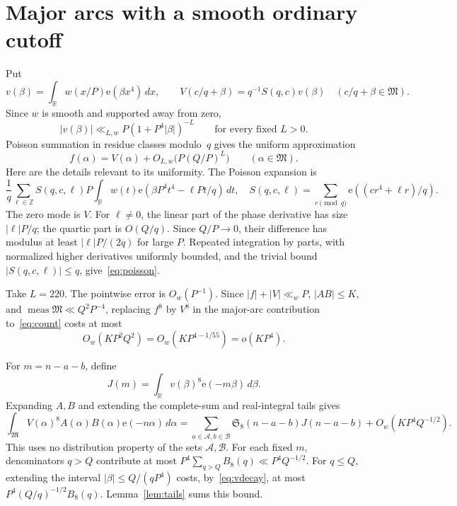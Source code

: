 \documentclass[11pt]{article}
\theoremstyle{remark}\newtheorem*{remark}{Remark}
\newcommand{\e}{\mathrm e}
\newcommand{\M}{\mathfrak M}
\newcommand{\SSS}{\mathfrak S}
\DeclareMathOperator{\meas}{meas}
\begin{document}
\section{Major arcs with a smooth ordinary cutoff}

Put
\[
 v(\beta)=\int_{\mathbb R}w(x/P)\e(\beta x^4)\,dx,
 \qquad V(c/q+\beta)=q^{-1}S(q,c)v(\beta)
 \quad(c/q+\beta\in\M).
\]
Since \(w\) is smooth and supported away from zero,
\begin{equation}\label{eq:vdecay}
 |v(\beta)|\ll_{L,w}P(1+P^4|\beta|)^{-L}
 \qquad\text{for every fixed }L>0.
\end{equation}
Poisson summation in residue classes modulo~\(q\) gives the uniform
approximation
\begin{equation}\label{eq:poisson}
 f(\alpha)=V(\alpha)+O_{L,w}\bigl(P(Q/P)^L\bigr)
 \qquad(\alpha\in\M).
\end{equation}
Here are the details relevant to its uniformity. The Poisson expansion is
\[
 \frac1q\sum_{\ell\in\mathbb Z}S(q,c,\ell)P
 \int_{\mathbb R}w(t)\e(\beta P^4t^4-\ell Pt/q)\,dt,
 \quad S(q,c,\ell)=\sum_{r\pmod q}\e((cr^4+\ell r)/q).
\]
The zero mode is \(V\). For \(\ell\ne0\), the linear part of the
phase derivative has size \(|\ell|P/q\); the quartic part is \(O(Q/q)\).
Since \(Q/P\to0\), their difference has modulus at least
\(|\ell|P/(2q)\) for large \(P\). Repeated integration by parts,
with normalized higher derivatives uniformly bounded, and the trivial
bound \(|S(q,c,\ell)|\le q\), give~\eqref{eq:poisson}.

Take \(L=220\). The pointwise error is \(O_w(P^{-1})\).
Since \(|f|+|V|\ll_w P\), \(|AB|\le K\), and
\(\meas\M\ll Q^2P^{-4}\), replacing \(f^8\) by \(V^8\) in
the major-arc contribution to~\eqref{eq:count} costs at most
\begin{equation}\label{eq:replace}
 O_w(KP^2Q^2)=O_w(KP^{4-1/55})=o(KP^4).
\end{equation}

For \(m=n-a-b\), define
\[
 J(m)=\int_{\mathbb R}v(\beta)^8\e(-m\beta)\,d\beta.
\]
Expanding \(A,B\) and extending the complete-sum and real-integral
tails gives
\begin{equation}\label{eq:major}
 \int_\M V(\alpha)^8A(\alpha)B(\alpha)\e(-n\alpha)\,d\alpha
 =\sum_{a\in\mathcal A,b\in\mathcal B}\SSS_8(n-a-b)J(n-a-b)
   +O_w(KP^4Q^{-1/2}).
\end{equation}
This uses no distribution property of the sets \(\mathcal A,\mathcal B\).
For each fixed \(m\), denominators \(q>Q\) contribute at most
\(P^4\sum_{q>Q}B_8(q)\ll P^4Q^{-1/2}\).
For \(q\le Q\), extending the interval
\(|\beta|\le Q/(qP^4)\) costs, by~\eqref{eq:vdecay}, at most
\(P^4(Q/q)^{-1/2}B_8(q)\). Lemma~\ref{lem:tails} sums this bound.
\end{document}
